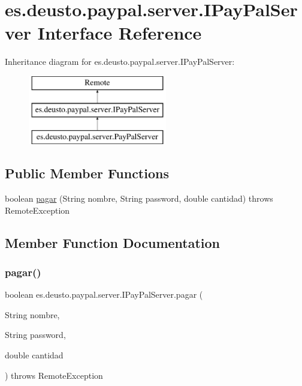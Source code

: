 \hypertarget{interfacees_1_1deusto_1_1paypal_1_1server_1_1_i_pay_pal_server}{}\section{es.\+deusto.\+paypal.\+server.\+I\+Pay\+Pal\+Server Interface Reference}
\label{interfacees_1_1deusto_1_1paypal_1_1server_1_1_i_pay_pal_server}
Inheritance diagram for es.\+deusto.\+paypal.\+server.\+I\+Pay\+Pal\+Server\+:\begin{figure}[H]
\begin{center}
\leavevmode
\includegraphics[height=3.000000cm]{interfacees_1_1deusto_1_1paypal_1_1server_1_1_i_pay_pal_server}
\end{center}
\end{figure}
\subsection*{Public Member Functions}
\begin{DoxyCompactItemize}
\item 
boolean \mbox{\hyperlink{interfacees_1_1deusto_1_1paypal_1_1server_1_1_i_pay_pal_server_ab1b1c0e07f6c01ccd6d8c3f8a35d6eac}{pagar}} (String nombre, String password, double cantidad)  throws Remote\+Exception
\end{DoxyCompactItemize}


\subsection{Member Function Documentation}
\mbox{\label{interfacees_1_1deusto_1_1paypal_1_1server_1_1_i_pay_pal_server_ab1b1c0e07f6c01ccd6d8c3f8a35d6eac}} 
\subsubsection{\texorpdfstring{pagar()}{pagar()}}
{\footnotesize\ttfamily boolean es.\+deusto.\+paypal.\+server.\+I\+Pay\+Pal\+Server.\+pagar (\begin{DoxyParamCaption}\item[{String}]{nombre,  }\item[{String}]{password,  }\item[{double}]{cantidad }\end{DoxyParamCaption}) throws Remote\+Exception}



